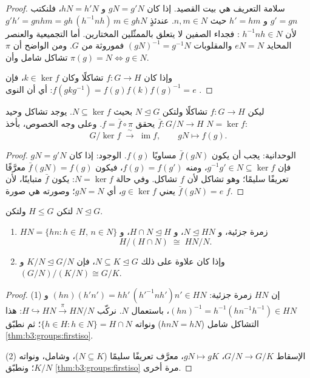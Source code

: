 \begin{proof}
سلامة التعريف هي بيت القصيد. إذا كان $gN = g'N$ و $hN = h'N$،
فلنكتب $g' = gn$ و $h' = hm$ حيث $n, m \in N$. عندئذٍ $g'h' = gnhm =
gh\,(h^{-1}nh)\,m \in ghN$
لأن $h^{-1}nh \in N$ : فجداء الصفين لا يتعلق بالممثّلين
المختارين. أما التجميعية والعنصر المحايد $eN = N$ والمقلوبات $(gN)^{-1} = g^{-1}N$
فموروثة من $G$. ومن الواضح أن $\pi$ تشاكل شامل وأن
$\pi(g) = N \iff g \in N$.

وإذا كان $f \colon G \to H$ تشاكلًا وكان $k \in \ker f$، فإن
$f(gkg^{-1}) = f(g)f(k)f(g)^{-1} = e$: أي أن النوى .
\end{proof}

\begin{theorem}
\label{thm:b3:groups:firstiso}
ليكن $f \colon G \to H$ تشاكلًا ولتكن $N \trianglelefteq G$ بحيث
$N \subseteq \ker f$. يوجد تشاكل وحيد $\bar f \colon G/N
\to H$ يحقق $f = \bar f \circ \pi$. وعلى وجه الخصوص، بأخذ $N = \ker
f$:
\[
G/\ker f \;\xrightarrow{\;\sim\;}\; \operatorname{im} f,
\qquad gN \mapsto f(g).
\]
\end{theorem}

\begin{proof}
الوحدانية: يجب أن يكون $\bar f(gN)$ مساويًا $f(g)$. الوجود: إذا كان
$gN = g'N$ فإن $g^{-1}g' \in N \subseteq \ker f$، ومنه $f(g) = f(g')$، فيكون $\bar
f(gN) = f(g)$
معرَّفًا تعريفًا سليمًا؛ وهو تشاكل لأن $f$ تشاكل. وفي حالة
$N = \ker f$: يكون $\bar f$ متباينًا، لأن $\bar f(gN) = e$ يعني
$g \in \ker f$، أي $gN = N$؛ وصورته هي صورة $f$.
\end{proof}

\begin{theorem}
\label{thm:b3:groups:secondiso}
لتكن $H \leq G$ ولتكن $N \trianglelefteq G$.
\begin{enumerate}
  \item $HN = \{hn : h \in H,\, n \in N\}$ زمرة جزئية، و $N
        \trianglelefteq HN$، و $H \cap N \trianglelefteq H$، و
        \[
        H/(H \cap N) \;\cong\; HN/N .
        \]
  \item وإذا كان علاوة على ذلك $N \subseteq K \trianglelefteq G$، فإن $K/N
        \trianglelefteq G/N$ و $(G/N)\big/(K/N) \cong G/K$.
\end{enumerate}
\end{theorem}

\begin{proof}
(1) إن $HN$ زمرة جزئية: $(hn)(h'n') = hh'\,(h'^{-1}nh')n' \in HN$
و $(hn)^{-1} = h^{-1}(hn^{-1}h^{-1}) \in HN$، باستعمال 
$N$. نركّب $H \hookrightarrow HN \xrightarrow{\pi} HN/N$: هذا
التشاكل شامل ($hnN = hN$) ونواته $\{h \in H : h \in
N\} = H \cap N$؛ ثم نطبّق \cref{thm:b3:groups:firstiso}.

(2) الإسقاط $G/N \to G/K$، $gN \mapsto gK$، معرَّف تعريفًا سليمًا
($N \subseteq K$)، وشامل، ونواته $K/N$؛ ونطبّق
\cref{thm:b3:groups:firstiso} مرة أخرى.
\end{proof}

